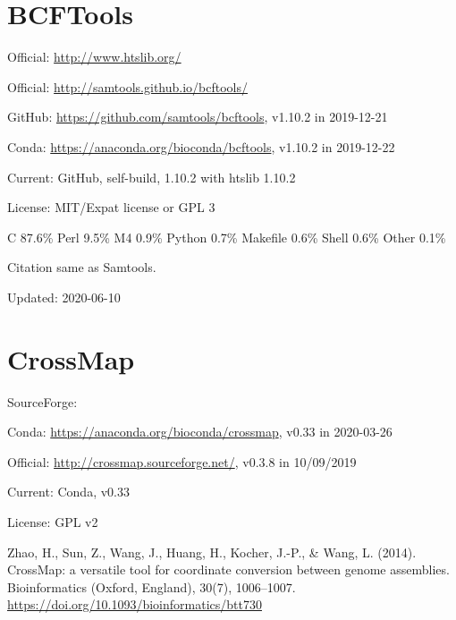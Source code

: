 \documentclass[]{article}
\begin{document}
\section{BCFTools}

Official: \url{http://www.htslib.org/}

Official: \url{http://samtools.github.io/bcftools/}

GitHub: \url{https://github.com/samtools/bcftools}, v1.10.2 in 2019-12-21

Conda: \url{https://anaconda.org/bioconda/bcftools}, v1.10.2 in 2019-12-22

Current: GitHub, self-build, 1.10.2 with htslib 1.10.2

License: MIT/Expat license or GPL 3

C 87.6\% Perl 9.5\% M4 0.9\% Python 0.7\% Makefile 0.6\% Shell 0.6\% Other 0.1\%

Citation same as Samtools.

Updated: 2020-06-10

\section{CrossMap}

SourceForge: 

Conda: \url{https://anaconda.org/bioconda/crossmap}, v0.33 in 2020-03-26

Official: \url{http://crossmap.sourceforge.net/}, v0.3.8 in 10/09/2019

Current: Conda, v0.33

License: GPL v2

Zhao, H., Sun, Z., Wang, J., Huang, H., Kocher, J.-P., \& Wang, L. (2014). CrossMap: a versatile tool for coordinate conversion between genome assemblies. Bioinformatics (Oxford, England), 30(7), 1006–1007. \url{https://doi.org/10.1093/bioinformatics/btt730}
\end{document}
